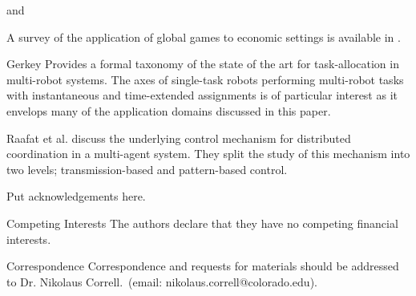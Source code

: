 \documentclass{nature}
\begin{document}
\cite{Theraulaz1998} and \cite{Bonabeau1998}

\cite{Martinoli1999}

\cite{Bonabeau2000}

\cite{Krieger2000}

\cite{Kube2000}

A survey of the application of global games to economic settings is available in \cite{Morris2000}.

\cite{Pynadath2002}

\cite{Conradt2003}

\cite{Mataric2003}

\cite{Gerkey2003}

Gerkey \cite{Gerkey2004} Provides a formal taxonomy of the state of the art for task-allocation in multi-robot systems. The axes of single-task robots performing multi-robot tasks with instantaneous and time-extended assignments is of particular interest as it envelops many of the application domains discussed in this paper.

\cite{Conradt2005}

Raafat et al. \cite{Raafat2009} discuss the underlying control mechanism for distributed coordination in a multi-agent system. They split the study of this mechanism into two levels; transmission-based and pattern-based control. 

\cite{Yoshida2010}

\cite{Suzuki2015}






\begin{addendum}
 \item Put acknowledgements here.
 \item[Competing Interests] The authors declare that they have no
competing financial interests.
 \item[Correspondence] Correspondence and requests for materials
should be addressed to Dr. Nikolaus Correll.~(email: nikolaus.correll@colorado.edu).
\end{addendum}

\end{document}
